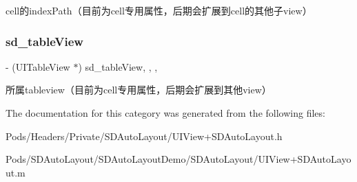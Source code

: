 cell的index\+Path（目前为cell专用属性，后期会扩展到cell的其他子view） \mbox{\label{category_u_i_view_07_s_d_auto_layout_08_a3fe94c00196883ca7e2c85ce4348a540}} 
\subsubsection{\texorpdfstring{sd\+\_\+table\+View}{sd\_tableView}}
{\footnotesize\ttfamily -\/ (U\+I\+Table\+View $\ast$) sd\+\_\+table\+View\hspace{0.3cm}{\ttfamily [read]}, {\ttfamily [write]}, {\ttfamily [nonatomic]}, {\ttfamily [assign]}}

所属tableview（目前为cell专用属性，后期会扩展到其他view） 

The documentation for this category was generated from the following files\+:\begin{DoxyCompactItemize}
\item 
Pods/\+Headers/\+Private/\+S\+D\+Auto\+Layout/U\+I\+View+\+S\+D\+Auto\+Layout.\+h\item 
Pods/\+S\+D\+Auto\+Layout/\+S\+D\+Auto\+Layout\+Demo/\+S\+D\+Auto\+Layout/U\+I\+View+\+S\+D\+Auto\+Layout.\+m\end{DoxyCompactItemize}
